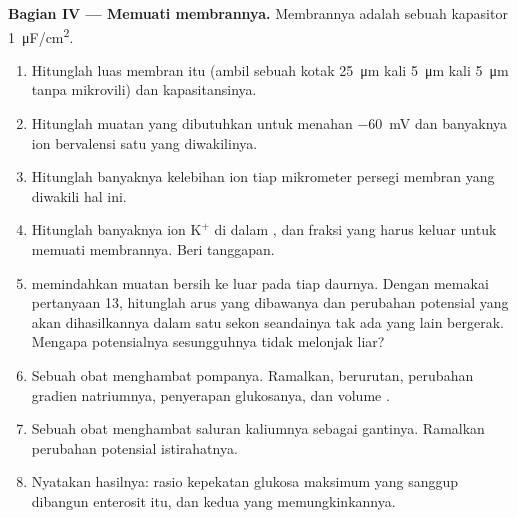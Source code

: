 \begin{problem}
\medskip
\noindent\textbf{Bagian IV --- Memuati membrannya.}
Membrannya adalah sebuah kapasitor \qty{1}{\micro F/cm^2}.
\begin{enumerate}[resume]
  \item Hitunglah luas membran  itu (ambil sebuah kotak
        \qty{25}{\micro m} kali \qty{5}{\micro m} kali
        \qty{5}{\micro m} tanpa mikrovili) dan kapasitansinya.
  \item Hitunglah muatan yang dibutuhkan untuk menahan \qty{-60}{mV}
        dan banyaknya ion bervalensi satu yang diwakilinya.
  \item Hitunglah banyaknya kelebihan ion tiap mikrometer persegi
        membran yang diwakili hal ini.
  \item Hitunglah banyaknya ion $\mathrm{K^+}$ di dalam , dan
        fraksi yang harus keluar untuk memuati membrannya. Beri
        tanggapan.
  \item {} memindahkan muatan bersih ke luar pada tiap daurnya.
        Dengan memakai pertanyaan 13, hitunglah arus yang dibawanya dan
        perubahan potensial yang akan dihasilkannya dalam satu sekon
        seandainya tak ada yang lain bergerak. Mengapa potensialnya
        sesungguhnya tidak melonjak liar?
  \item Sebuah obat menghambat pompanya. Ramalkan, berurutan, perubahan
        gradien natriumnya, penyerapan glukosanya, 
        dan volume .
  \item Sebuah obat menghambat saluran kaliumnya sebagai gantinya.
        Ramalkan perubahan potensial istirahatnya.
  \item Nyatakan hasilnya: rasio kepekatan glukosa maksimum yang
        sanggup dibangun enterosit itu, dan kedua  yang
        memungkinkannya.
\end{enumerate}
\end{problem}
